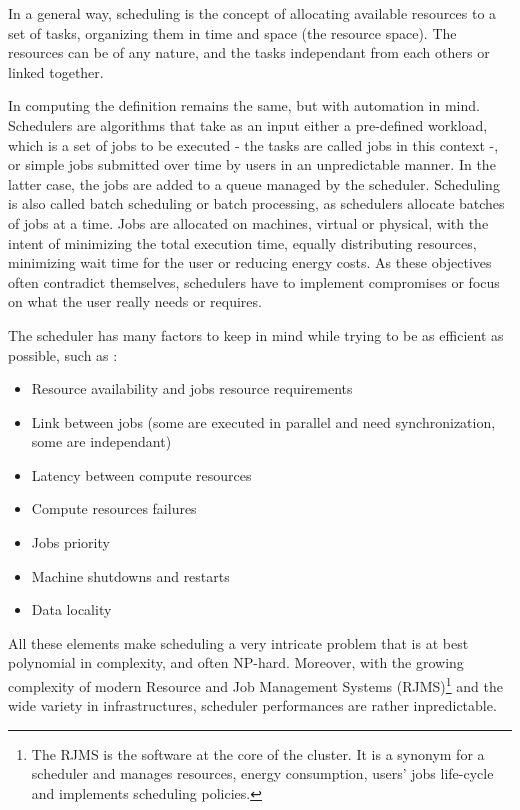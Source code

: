 \documentclass[12pt, a4paper]{memoir}
\begin{document}
In a general way, scheduling is the concept of allocating available resources
to a set of tasks, organizing them in time and space (the resource space). The
resources can be of any nature, and the tasks independant from each others or
linked together.

In computing the definition remains the same, but with automation in mind.
Schedulers are algorithms that take as an input either a pre-defined workload,
which is a set of jobs  to be executed - the tasks are called jobs in this
context -, or simple jobs submitted over time by users in an unpredictable
manner. In the latter case, the jobs are added to a queue managed by the
scheduler. Scheduling is also called batch scheduling or batch processing, as
schedulers allocate batches of jobs at a time. Jobs are allocated on machines,
virtual or physical, with the intent of minimizing the total execution time,
equally distributing resources, minimizing wait time for the user or reducing
energy costs. As these objectives often contradict themselves, schedulers have
to implement compromises or focus on what the user really needs or requires.  

The scheduler has many factors to keep in mind while trying to be as efficient
as possible, such as :

\begin{itemize}
	\item Resource availability and jobs resource requirements
	\item Link between jobs (some are executed in parallel and need synchronization, some are independant)
	\item Latency between compute resources
	\item Compute resources failures
	\item Jobs priority
	\item Machine shutdowns and restarts
	\item Data locality
\end{itemize}

All these elements make scheduling a very intricate problem that is at best
polynomial in complexity, and often NP-hard\cite{scheduler-complexity}.
Moreover, with the growing complexity of modern Resource and Job Management
Systems (RJMS)\footnote{The RJMS is the software at the core of the cluster. It
	is a synonym for a scheduler and manages resources, energy consumption,
	users' jobs life-cycle and implements scheduling policies.} and the
wide variety in infrastructures, scheduler performances are rather
inpredictable.
\end{document}
